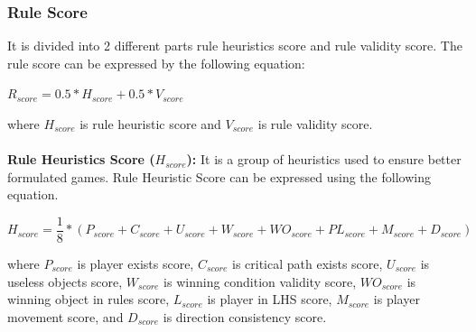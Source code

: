 \subsubsection{Rule Score}
It is divided into 2 different parts rule heuristics score and rule validity score. The rule score can be expressed by the following equation:
\begin{center}
$R_{score} = 0.5 * H_{score} + 0.5 * V_{score}$
\end{center}
where $H_{score}$ is rule heuristic score and $V_{score}$ is rule validity score.\\\\
\textbf{Rule Heuristics Score ($H_{score}$):} It is a group of heuristics used to ensure better formulated games. Rule Heuristic Score can be expressed using the following equation.
\begin{center}
$H_{score} = \dfrac{1}{8} * (P_{score} + C_{score} + U_{score} + W_{score} + WO_{score} + PL_{score} + M_{score} + D_{score})$
\end{center}
where $P_{score}$ is player exists score, $C_{score}$ is critical path exists score, $U_{score}$ is useless objects score, $W_{score}$ is winning condition validity score, $WO_{score}$ is winning object in rules score, $L_{score}$ is player in LHS score, $M_{score}$ is player movement score, and $D_{score}$ is direction consistency score.

